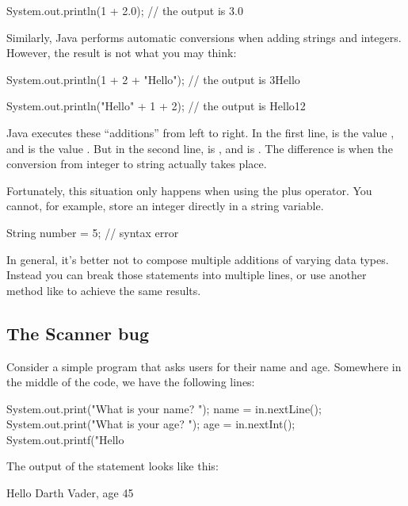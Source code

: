 \begin{code}
    System.out.println(1 + 2.0);
    // the output is 3.0
\end{code}

Similarly, Java performs automatic conversions when adding strings and integers.
However, the result is not what you may think:

\begin{code}
    System.out.println(1 + 2 + "Hello");
    // the output is 3Hello
    
    System.out.println("Hello" + 1 + 2);
    // the output is Hello12
\end{code}

Java executes these ``additions'' from left to right.
In the first line,  is the value , and  is the value .
But in the second line,  is , and  is .
The difference is when the conversion from integer to string actually takes place.

Fortunately, this situation only happens when using the plus operator.
You cannot, for example, store an integer directly in a string variable.

\begin{code}
     String number = 5;  // syntax error
\end{code}

In general, it's better not to compose multiple additions of varying data types.
Instead you can break those statements into multiple lines, or use another method like  to achieve the same results.

\subsection{The Scanner bug}

Consider a simple program that asks users for their name and age.
Somewhere in the middle of the code, we have the following lines:

\begin{code}
    System.out.print("What is your name? ");
    name = in.nextLine();
    System.out.print("What is your age? ");
    age = in.nextInt();
    System.out.printf("Hello %
\end{code}

The output of the  statement looks like this:

\begin{stdout}
    Hello Darth Vader, age 45
\end{stdout}

